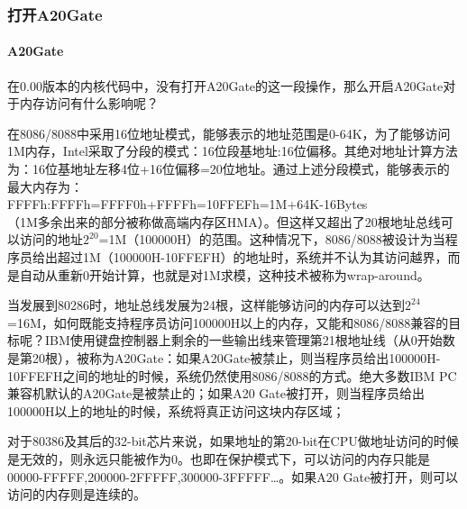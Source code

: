 \documentclass[12pt]{article}
\begin{document}
\subsubsection{打开A20Gate}
\paragraph{A20Gate}
在0.00版本的内核代码中，没有打开A20Gate的这一段操作，那么开启A20Gate对于内存访问有什么影响呢？

在8086/8088中采用16位地址模式，能够表示的地址范围是0-64K，为了能够访问1M内存，Intel采取了分段的模式：16位段基地址:16位偏移。其绝对地址计算方法为：16位基地址左移4位+16位偏移=20位地址。通过上述分段模式，能够表示的最大内存为：\\
FFFFh:FFFFh=FFFF0h+FFFFh=10FFEFh=1M+64K-16Bytes\\
（1M多余出来的部分被称做高端内存区HMA）。但这样又超出了20根地址总线可以访问的地址$2^{20}$=1M（100000H）的范围。这种情况下，8086/8088被设计为当程序员给出超过1M（100000H-10FFEFH）的地址时，系统并不认为其访问越界，而是自动从重新0开始计算，也就是对1M求模，这种技术被称为wrap-around。

当发展到80286时，地址总线发展为24根，这样能够访问的内存可以达到$2^24$=16M，如何既能支持程序员访问100000H以上的内存，又能和8086/8088兼容的目标呢？IBM使用键盘控制器上剩余的一些输出线来管理第21根地址线（从0开始数是第20根），被称为A20Gate：如果A20Gate被禁止，则当程序员给出100000H-10FFEFH之间的地址的时候，系统仍然使用8086/8088的方式。绝大多数IBM PC兼容机默认的A20Gate是被禁止的；如果A20 Gate被打开，则当程序员给出100000H以上的地址的时候，系统将真正访问这块内存区域；

对于80386及其后的32-bit芯片来说，如果地址的第20-bit在CPU做地址访问的时候是无效的，则永远只能被作为0。也即在保护模式下，可以访问的内存只能是00000-FFFFF,200000-2FFFFF,300000-3FFFFF…。如果A20 Gate被打开，则可以访问的内存则是连续的。
\end{document}
